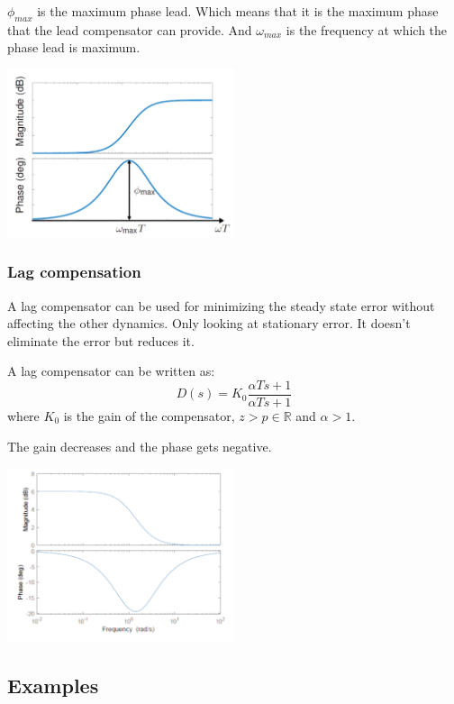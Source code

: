 $\phi_{max}$ is the maximum phase lead. Which means that it is the
maximum phase that the lead compensator can provide.
And $\omega_{max}$ is the frequency at which the phase lead is maximum.


\begin{center}
	\includegraphics[width=0.5\textwidth]{Images/leadComp.png}
\end{center}

\subsubsection{Lag compensation}
A lag compensator can be used for minimizing the steady state error without affecting
the other dynamics. Only looking at stationary error. It doesn't eliminate the error
but reduces it.

A lag compensator can be written as:
$$D(s) = K_0 \frac{\alpha Ts+1}{\alpha Ts+1}$$
where $K_0$ is the gain of the compensator, $z>p \in \mathbb{R}$ and $\alpha > 1$.

The gain decreases and the phase gets negative.


\begin{center}
	\includegraphics[width=0.5\textwidth]{Images/lagComp.png}
\end{center}

\subsection{Examples}
